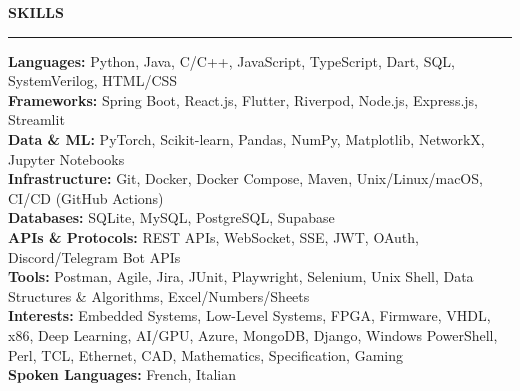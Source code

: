 \documentclass[10pt,letterpaper]{article}
\newcommand{\resumesection}[1]{%
  \vspace{5pt}
  \noindent\textsc{\textbf{\large #1}}
  \vspace{1pt}
  \hrule
  \vspace{2pt}
}
\begin{document}
\resumesection{SKILLS}
\noindent\textbf{Languages:} Python, Java, C/C++, JavaScript, TypeScript, Dart, SQL, SystemVerilog, HTML/CSS \\[1pt]
\textbf{Frameworks:} Spring Boot, React.js, Flutter, Riverpod, Node.js, Express.js, Streamlit \\[1pt]
\textbf{Data \& ML:} PyTorch, Scikit-learn, Pandas, NumPy, Matplotlib, NetworkX, Jupyter Notebooks \\[1pt]
\textbf{Infrastructure:} Git, Docker, Docker Compose, Maven, Unix/Linux/macOS, CI/CD (GitHub Actions) \\[1pt]
\textbf{Databases:} SQLite, MySQL, PostgreSQL, Supabase \\[1pt]
\textbf{APIs \& Protocols:} REST APIs, WebSocket, SSE, JWT, OAuth, Discord/Telegram Bot APIs \\[1pt]
\textbf{Tools:} Postman, Agile, Jira, JUnit, Playwright, Selenium, Unix Shell, Data Structures \& Algorithms, Excel/Numbers/Sheets \\[1pt]
\textbf{Interests:} Embedded Systems, Low-Level Systems, FPGA, Firmware, VHDL, x86, Deep Learning, AI/GPU, Azure, MongoDB, Django, Windows PowerShell, Perl, TCL, Ethernet, CAD, Mathematics, Specification, Gaming \\[1pt]
\textbf{Spoken Languages:} French, Italian
\end{document}
